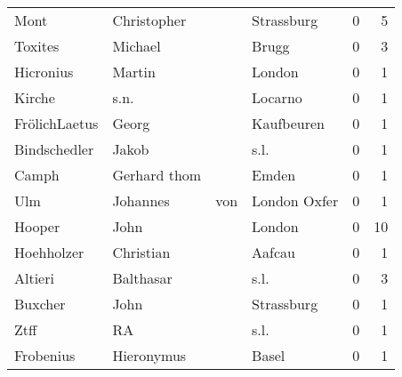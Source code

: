 \begin{tabular}{llllrr}
                     Mont &                        Christopher &             &                                  Strassburg &          0 &         5 \\
                  Toxites &                            Michael &             &                                       Brugg &          0 &         3 \\
                Hicronius &                             Martin &             &                                      London &          0 &         1 \\
                   Kirche &                               s.n. &             &                                     Locarno &          0 &         1 \\
            FrölichLaetus &                              Georg &             &                                  Kaufbeuren &          0 &         1 \\
             Bindschedler &                              Jakob &             &                                        s.l. &          0 &         1 \\
                    Camph &                       Gerhard thom &             &                                       Emden &          0 &         1 \\
                      Ulm &                           Johannes &         von &                                London Oxfer &          0 &         1 \\
                   Hooper &                               John &             &                                      London &          0 &        10 \\
               Hoehholzer &                          Christian &             &                                      Aafcau &          0 &         1 \\
                  Altieri &                          Balthasar &             &                                        s.l. &          0 &         3 \\
                  Buxcher &                               John &             &                                  Strassburg &          0 &         1 \\
                     Ztff &                                 RA &             &                                        s.l. &          0 &         1 \\
                Frobenius &                         Hieronymus &             &                                       Basel &          0 &         1 \\

\end{tabular}
